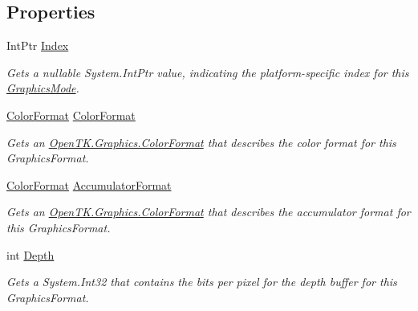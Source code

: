 \subsection*{Properties}
\begin{DoxyCompactItemize}
\item 
Int\-Ptr \hyperlink{class_open_t_k_1_1_graphics_1_1_graphics_mode_ad3caab1ad7640a5389abc809874fa57e}{Index}
\begin{DoxyCompactList}\small\item\em Gets a nullable System.\-Int\-Ptr value, indicating the platform-\/specific index for this \hyperlink{class_open_t_k_1_1_graphics_1_1_graphics_mode}{Graphics\-Mode}. \end{DoxyCompactList}\item 
\hyperlink{struct_open_t_k_1_1_graphics_1_1_color_format}{Color\-Format} \hyperlink{class_open_t_k_1_1_graphics_1_1_graphics_mode_ae10e9972591996e85c2fedca3f86a5e4}{Color\-Format}
\begin{DoxyCompactList}\small\item\em Gets an \hyperlink{struct_open_t_k_1_1_graphics_1_1_color_format}{Open\-T\-K.\-Graphics.\-Color\-Format} that describes the color format for this Graphics\-Format. \end{DoxyCompactList}\item 
\hyperlink{struct_open_t_k_1_1_graphics_1_1_color_format}{Color\-Format} \hyperlink{class_open_t_k_1_1_graphics_1_1_graphics_mode_aa03854ffcfde8d47580aa7038c6151f6}{Accumulator\-Format}
\begin{DoxyCompactList}\small\item\em Gets an \hyperlink{struct_open_t_k_1_1_graphics_1_1_color_format}{Open\-T\-K.\-Graphics.\-Color\-Format} that describes the accumulator format for this Graphics\-Format. \end{DoxyCompactList}\item 
int \hyperlink{class_open_t_k_1_1_graphics_1_1_graphics_mode_a03e27f56e7b50e680e42503b51e0c2a8}{Depth}
\begin{DoxyCompactList}\small\item\em Gets a System.\-Int32 that contains the bits per pixel for the depth buffer for this Graphics\-Format. \end{DoxyCompactList}\item 

\end{DoxyCompactItemize}
